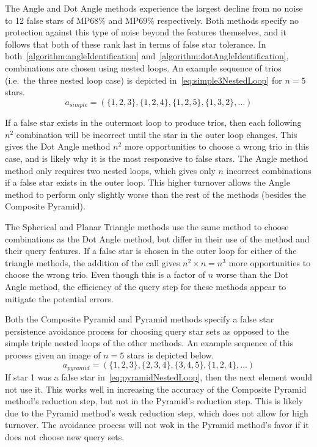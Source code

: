 The Angle and Dot Angle methods experience the largest decline from no noise to 12 false stars of MP68\% and MP69\%
respectively.
Both methods specify no protection against this type of noise beyond the features themselves, and it follows that
both of these rank last in terms of false star tolerance.
In both~\autoref{algorithm:angleIdentification} and~\autoref{algorithm:dotAngleIdentification}, combinations are chosen
using nested loops.
An example sequence of trios (i.e.\ the three nested loop case) is depicted in~\autoref{eq:simple3NestedLoop} for
$n = 5$ stars.
\begin{equation}\label{eq:simple3NestedLoop}
a_{simple} = ( \{1,2,3\}, \{1,2,4\}, \{1,2,5\}, \{1,3,2\}, \ldots )
\end{equation}

If a false star exists in the outermost loop to produce trios, then each following $n^2$ combination will be incorrect
until the star in the outer loop changes.
This gives the Dot Angle method $n^2$ more opportunities to choose a wrong trio in this case, and is likely why it is
the most responsive to false stars.
The Angle method method only requires two nested loops, which gives only $n$ incorrect combinations if a false star
exists in the outer loop.
This higher turnover allows the Angle method to perform only slightly worse than the rest of the methods (besides
the Composite Pyramid).

The Spherical and Planar Triangle methods use the same method to choose combinations as the Dot Angle method, but differ
in their use of the  method and their query features.
If a false star is chosen in the outer loop for either of the triangle methods, the addition of the  call
gives $n^2 \times n = n^3$ more opportunities to choose the wrong trio.
Even though this is a factor of $n$ worse than the Dot Angle method, the efficiency of the query step for these
methods appear to mitigate the potential errors.

Both the Composite Pyramid and Pyramid methods specify a false star persistence avoidance process for choosing
query star sets as opposed to the simple triple nested loops of the other methods.
An example sequence of this process given an image of $n=5$ stars is depicted below.
\begin{equation}\label{eq:pyramidNestedLoop}
a_{pyramid} = ( \{1,2,3\}, \{2,3,4\}, \{3,4,5\}, \{1,2,4\}, \ldots)
\end{equation}
If star 1 was a false star in~\autoref{eq:pyramidNestedLoop}, then the next element would not use it.
This works well in increasing the accuracy of the Composite Pyramid method's reduction step, but not in the Pyramid's
reduction step.
This is likely due to the Pyramid method's weak reduction step, which does not allow for high turnover.
The avoidance process will not wok in the Pyramid method's favor if it does not choose new query sets.

